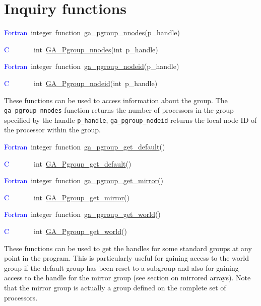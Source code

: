 \section{Inquiry functions}
\begin{lyxcode}
\textcolor{blue}{Fortran}~integer~function~\href{http://www.emsl.pnl.gov/docs/global/ga_ops.html\#GA_PGROUP_NNODES}{ga\_{}pgroup\_{}nnodes}(p\_handle)

\textcolor{blue}{C}~~~~~~~int~\href{http://www.emsl.pnl.gov/docs/global/c_nga_ops.html\#GA_PGROUP_NNODES}{GA\_{}Pgroup\_{}nnodes}(int~p\_handle)

\textcolor{blue}{Fortran}~integer~function~\href{http://www.emsl.pnl.gov/docs/global/ga_ops.html\#GA_PGROUP_NODEID}{ga\_{}pgroup\_{}nodeid}(p\_handle)

\textcolor{blue}{C}~~~~~~~int~\href{http://www.emsl.pnl.gov/docs/global/c_nga_ops.html\#GA_PGROUP_NODEID}{GA\_{}Pgroup\_{}nodeid}(int~p\_handle)
\end{lyxcode}
These functions can be used to access information about the group.
The \texttt{ga\_pgroup\_nnodes} function returns the number of processors
in the group specified by the handle \texttt{p\_handle}, \texttt{ga\_pgroup\_nodeid}
returns the local node ID of the processor within the group.
\begin{lyxcode}
\textcolor{blue}{Fortran}~integer~function~\href{http://www.emsl.pnl.gov/docs/global/ga_ops.html\#GA_PGROUP_GET_DEFAULT}{ga\_{}pgroup\_{}get\_{}default}()

\textcolor{blue}{C}~~~~~~~int~\href{http://www.emsl.pnl.gov/docs/global/c_nga_ops.html\#GA_PGROUP_GET_DEFAULT}{GA\_{}Pgroup\_{}get\_{}default}()

\textcolor{blue}{Fortran}~integer~function~\href{http://www.emsl.pnl.gov/docs/global/ga_ops.html\#GA_PGROUP_GET_MIRROR}{ga\_{}pgroup\_{}get\_{}mirror}()

\textcolor{blue}{C}~~~~~~~int~\href{http://www.emsl.pnl.gov/docs/global/c_nga_ops.html\#GA_PGROUP_GET_MIRROR}{GA\_{}Pgroup\_{}get\_{}mirror}()

\textcolor{blue}{Fortran}~integer~function~\href{http://www.emsl.pnl.gov/docs/global/ga_ops.html\#GA_PGROUP_GET_WORLD}{ga\_{}pgroup\_{}get\_{}world}()

\textcolor{blue}{C}~~~~~~~int~\href{http://www.emsl.pnl.gov/docs/global/c_nga_ops.html\#GA_PGROUP_GET_WORLD}{GA\_{}Pgroup\_{}get\_{}world}()
\end{lyxcode}
These functions can be used to get the handles for some standard groups
at any point in the program. This is particularly useful for gaining
access to the world group if the default group has been reset to a
subgroup and also for gaining access to the handle for the mirror
group (see section on mirrored arrays). Note that the mirror group
is actually a group defined on the complete set of processors. 


